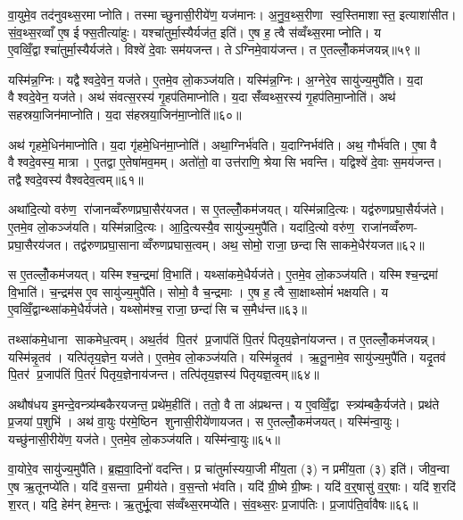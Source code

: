 वा॒युमे॒व तद॑नुवथ्स॒रमाप्नोति। तस्माच्छुनासी॒रीये॑ण॒ यज॑मानः। अ॒नु॒व॒थ्स॒रीणा स्व॒स्तिमाशास्त॒ इत्याशा॑सीत। सं॒व॒थ्स॒रव्वाँ ए॒ष ईफ्स॒तीत्या॑हुः। यश्चा॑तुर्मा॒स्यैर्यज॑त॒ इति॑। ए॒ष ह॒ त्वै स॑व्वँथ्स॒रमाप्नोति। य ए॒वव्विँ॒द्वाश्चा॑तुर्मा॒स्यैर्यज॑ते। विश्वे॑ दे॒वाः सम॑यजन्त। तेऽग्निमे॒वाय॑जन्त। त ए॒तल्लोँ॒कम॑जयन्न्॥५९॥

यस्मि॑न्न॒ग्निः। यद्वैश्वदे॒वेन॒ यज॑ते। ए॒तमे॒व लो॒कञ्ज॑यति। यस्मि॑न्न॒ग्निः। अ॒ग्नेरे॒व सायु॑ज्य॒मुपै॑ति। य॒दा वैश्वदे॒वेन॒ यज॑ते। अथ॑ संवत्स॒रस्य॑ गृ॒हप॑तिमाप्नोति। य॒दा सँ॑व्वथ्स॒रस्य॑ गृ॒हप॑तिमा॒प्नोति॑। अथ॑ सहस्रया॒जिन॑माप्नोति। य॒दा स॑हस्रया॒जिन॑मा॒प्नोति॑॥६०॥

अथ॑ गृहमे॒धिन॑माप्नोति। य॒दा गृ॑हमे॒धिन॑मा॒प्नोति॑। अथा॒ग्निर्भ॑वति। य॒दाग्निर्भव॑ति। अथ॒ गौर्भ॑वति। ए॒षा वै वैश्वदे॒वस्य॒ मात्रा। ए॒तद्वा ए॒तेषा॑मव॒मम्। अतो॑तो॒ वा उत्त॑राणि॒ श्रेयासि भवन्ति। यद्विश्वे॑ दे॒वाः स॒मय॑जन्त। तद्वैश्वदे॒वस्य॑ वैश्वदेव॒त्वम्॥६१॥

अथा॑दि॒त्यो वरु॑ण॒ रा॑जानव्वँरुणप्रघा॒सैर॑यजत। स ए॒तल्लोँ॒कम॑जयत्। यस्मि॑न्नादि॒त्यः। यद्व॑रुणप्रघा॒सैर्यज॑ते। ए॒तमे॒व लो॒कञ्ज॑यति। यस्मि॑न्नादि॒त्यः। आ॒दि॒त्यस्यै॒व सायु॑ज्य॒मुपै॑ति। यदा॑दि॒त्यो वरु॑ण॒ राजा॑नव्वँरुण- प्रघा॒सैरय॑जत। तद्व॑रुणप्रघा॒सानाव्वँरुणप्रघास॒त्वम्। अथ॒ सोमो॒ राजा॒ छन्दासि साकमे॒धैर॑यजत॥६२॥

स ए॒तल्लोँ॒कम॑जयत्। यस्मिश्च॒न्द्रमा॑ वि॒भाति॑। यथ्सा॑कमे॒धैर्यज॑ते। ए॒तमे॒व लो॒कञ्ज॑यति। यस्मिश्च॒न्द्रमा॑ वि॒भाति॑। च॒न्द्रम॑स ए॒व सायु॑ज्य॒मुपै॑ति। सोमो॒ वै च॒न्द्रमाः। ए॒ष ह॒ त्वै सा॒क्षाथ्सोमं॑ भक्षयति। य ए॒वव्विँ॒द्वान्थ्सा॑कमे॒धैर्यज॑ते। यथ्सोम॑श्च॒ राजा॒ छन्दा॑सि च स॒मैध॑न्त॥६३॥

तथ्सा॑कमे॒धाना साकमेध॒त्वम्। अथ॒र्तव॑ पि॒तर॑ प्र॒जाप॑तिं पि॒तरं॑ पितृय॒ज्ञेना॑यजन्त। त ए॒तल्लोँ॒कम॑जयन्न्। यस्मि॑न्नृ॒तव॑। यत्पि॑तृय॒ज्ञेन॒ यज॑ते। ए॒तमे॒व लो॒कञ्ज॑यति। यस्मि॑न्नृ॒तव॑। ऋ॒तू॒नामे॒व सायु॑ज्य॒मुपै॑ति। यदृ॒तव॑ पि॒तर॑ प्र॒जाप॑तिं पि॒तरं॑ पितृय॒ज्ञेनाय॑जन्त। तत्पि॑तृय॒ज्ञस्य॑ पितृयज्ञ॒त्वम्॥६४॥

अथौष॑धय इ॒मन्दे॒वन्त्र्य॑म्बकैरयजन्त॒ प्रथे॑म॒हीति॑। ततो॒ वै ता अ॑प्रथन्त। य ए॒वव्विँ॒द्वा स्त्र्य॑म्बकै॒र्यज॑ते। प्रथ॑ते प्र॒जया॑ प॒शुभि॑। अथ॑ वा॒युः प॑रमे॒ष्ठिन शुनासी॒रीये॑णायजत। स ए॒तल्लोँ॒कम॑जयत्। यस्मि॑न्वा॒युः। यच्छु॑नासी॒रीये॑ण॒ यज॑ते। ए॒तमे॒व लो॒कञ्ज॑यति। यस्मि॑न्वा॒युः॥६५॥

वा॒योरे॒व सायु॑ज्य॒मुपै॑ति। ब्र॒ह्म॒वा॒दिनो॑ वदन्ति। प्र चा॑तुर्मास्यया॒जी मी॑य॒ता (३) न प्रमी॑य॒ता (३) इति॑। जीव॒न्वा ए॒ष ऋ॒तूनप्ये॑ति। यदि॑ व॒सन्ता प्र॒मीय॑ते। व॒स॒न्तो भ॑वति। यदि॑ ग्री॒ष्मे ग्री॒ष्मः। यदि॑ व॒र्॒षासु॑ व॒र्॒षाः। यदि॑ श॒रदि॑ श॒रत्। यदि॒ हेम॑न् हेम॒न्तः। ऋ॒तुर्भू॒त्वा स॑व्वँथ्स॒रमप्ये॑ति। सं॒व॒थ्स॒रः प्र॒जाप॑तिः। प्र॒जाप॑ति॒र्वावैषः॥६६॥

